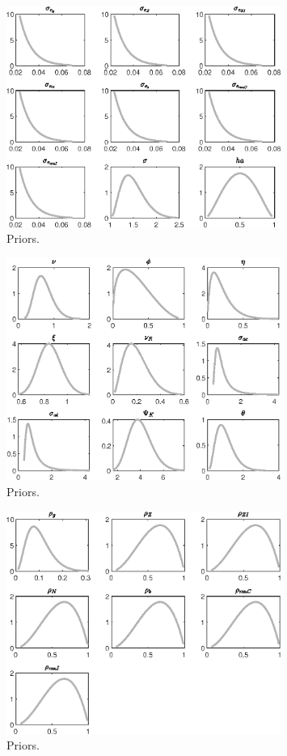  
\begin{figure}[H]
\centering
\includegraphics[width=0.80\textwidth]{BRS_sectoral_wo_demand_shocks/graphs/BRS_sectoral_wo_demand_shocks_Priors1}
\caption{Priors.}\label{Fig:Priors:1}
\end{figure}
\begin{figure}[H]
\centering
\includegraphics[width=0.80\textwidth]{BRS_sectoral_wo_demand_shocks/graphs/BRS_sectoral_wo_demand_shocks_Priors2}
\caption{Priors.}\label{Fig:Priors:2}
\end{figure}
\begin{figure}[H]
\centering
\includegraphics[width=0.80\textwidth]{BRS_sectoral_wo_demand_shocks/graphs/BRS_sectoral_wo_demand_shocks_Priors3}
\caption{Priors.}\label{Fig:Priors:3}
\end{figure}
 
